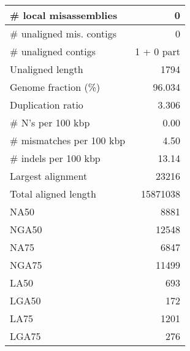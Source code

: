 \documentclass[12pt,a4paper]{article}
\begin{document}
\begin{table}[ht]
\begin{center}
\begin{tabular}{|l*{1}{|r}|}
\# local misassemblies & 0 \\ \hline
\# unaligned mis. contigs & 0 \\ \hline
\# unaligned contigs & 1 + 0 part \\ \hline
Unaligned length & 1794 \\ \hline
Genome fraction (\%) & 96.034 \\ \hline
Duplication ratio & 3.306 \\ \hline
\# N's per 100 kbp & 0.00 \\ \hline
\# mismatches per 100 kbp & 4.50 \\ \hline
\# indels per 100 kbp & 13.14 \\ \hline
Largest alignment & 23216 \\ \hline
Total aligned length & 15871038 \\ \hline
NA50 & 8881 \\ \hline
NGA50 & 12548 \\ \hline
NA75 & 6847 \\ \hline
NGA75 & 11499 \\ \hline
LA50 & 693 \\ \hline
LGA50 & 172 \\ \hline
LA75 & 1201 \\ \hline
LGA75 & 276 \\ \hline
\end{tabular}
\end{center}
\end{table}
\end{document}
